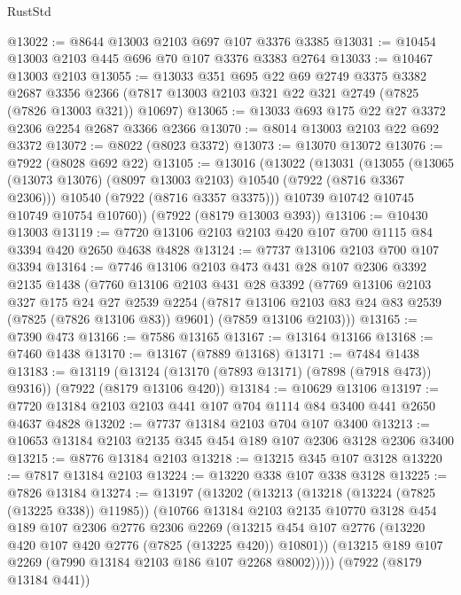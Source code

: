\begin{lexlean}{RustStd}
\begin{coremodule}
@13022 := @8644 @13003 @2103 @697 @107 @3376 @3385
@13031 := @10454 @13003 @2103 @445 @696 @70 @107 @3376 @3383 @2764
@13033 := @10467 @13003 @2103
@13055 := @13033
    @351
    @695
    @22
    @69
    @2749
    @3375
    @3382
    @2687
    @3356
    @2366
    (@7817 @13003 @2103 @321 @22 @321 @2749 (@7825 (@7826 @13003 @321)) @10697)
@13065 := @13033 @693 @175 @22 @27 @3372 @2306 @2254 @2687 @3366 @2366
@13070 := @8014 @13003 @2103 @22 @692 @3372
@13072 := @8022 (@8023 @3372)
@13073 := @13070 @13072
@13076 := @7922 (@8028 @692 @22)
@13105 := @13016
    (@13022
      (@13031
        (@13055
          (@13065 (@13073 @13076) (@8097 @13003 @2103) @10540 (@7922 (@8716 @3367 @2306)))
          @10540
          (@7922 (@8716 @3357 @3375)))
        @10739
        @10742
        @10745
        @10749
        @10754
        @10760))
    (@7922 (@8179 @13003 @393))
@13106 := @10430 @13003
@13119 := @7720 @13106 @2103 @2103 @420 @107 @700 @1115 @84 @3394 @420 @2650 @4638 @4828
@13124 := @7737 @13106 @2103 @700 @107 @3394
@13164 := @7746
    @13106
    @2103
    @473
    @431
    @28
    @107
    @2306
    @3392
    @2135
    @1438
    (@7760
      @13106
      @2103
      @431
      @28
      @3392
      (@7769
        @13106
        @2103
        @327
        @175
        @24
        @27
        @2539
        @2254
        (@7817 @13106 @2103 @83 @24 @83 @2539 (@7825 (@7826 @13106 @83)) @9601)
        (@7859 @13106 @2103)))
@13165 := @7390 @473
@13166 := @7586 @13165
@13167 := @13164 @13166
@13168 := @7460 @1438
@13170 := @13167 (@7889 @13168)
@13171 := @7484 @1438
@13183 := @13119
    (@13124 (@13170 (@7893 @13171) (@7898 (@7918 @473)) @9316))
    (@7922 (@8179 @13106 @420))
@13184 := @10629 @13106
@13197 := @7720 @13184 @2103 @2103 @441 @107 @704 @1114 @84 @3400 @441 @2650 @4637 @4828
@13202 := @7737 @13184 @2103 @704 @107 @3400
@13213 := @10653 @13184 @2103 @2135 @345 @454 @189 @107 @2306 @3128 @2306 @3400
@13215 := @8776 @13184 @2103
@13218 := @13215 @345 @107 @3128
@13220 := @7817 @13184 @2103
@13224 := @13220 @338 @107 @338 @3128
@13225 := @7826 @13184
@13274 := @13197
    (@13202
      (@13213
        (@13218 (@13224 (@7825 (@13225 @338)) @11985))
        (@10766
          @13184
          @2103
          @2135
          @10770
          @3128
          @454
          @189
          @107
          @2306
          @2776
          @2306
          @2269
          (@13215 @454 @107 @2776 (@13220 @420 @107 @420 @2776 (@7825 (@13225 @420)) @10801))
          (@13215 @189 @107 @2269 (@7990 @13184 @2103 @186 @107 @2268 @8002)))))
    (@7922 (@8179 @13184 @441))

\end{coremodule}
\end{lexlean}
